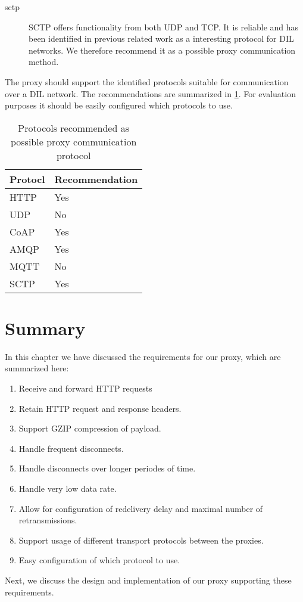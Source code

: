 \begin{description}
    \item[\gls{sctp}] SCTP offers functionality from both UDP and TCP. It is
    reliable and has been identified in previous related work as a interesting
    protocol for DIL networks. We therefore recommend it as a possible proxy
    communication method.

\end{description}

The proxy should support the identified protocols suitable for communication
over a DIL network. The recommendations are summarized in
\cref{table:possible-proxy-protocols}. For evaluation purposes it should be
easily configured which protocols to use.

\begin{table}[h]
\begin{tabularx}{\textwidth}{| X | X |}
\hline
  \textbf{Protocl} & \textbf{Recommendation} \\ \hline
  HTTP & Yes \\ \hline
  UDP & No \\ \hline
  CoAP & Yes \\ \hline
  AMQP & Yes \\ \hline
  MQTT & No \\ \hline
  SCTP & Yes \\ \hline
\end{tabularx}
\caption{Protocols recommended as possible proxy communication protocol}
\label{table:possible-proxy-protocols}
\end{table}



\section{Summary}

In this chapter we have discussed the requirements for our proxy, which are
summarized here:

\begin{enumerate}
    \item Receive and forward HTTP requests
    \item Retain HTTP request and response headers.
    \item Support GZIP compression of payload.
    \item Handle frequent disconnects.
    \item Handle disconnects over longer periodes of time.
    \item Handle very low data rate.
    \item Allow for configuration of redelivery delay and maximal number of retransmissions.
    \item Support usage of different transport protocols between the proxies.
    \item Easy configuration of which protocol to use.
\end{enumerate}

Next, we discuss the design and implementation of our proxy supporting these
requirements.
